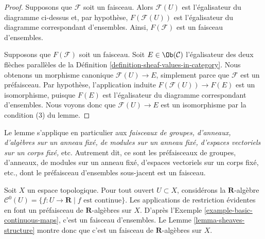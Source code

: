\begin{proof}
Supposons que $\mathcal{F}$ soit un faisceau. Alors
$\mathcal{F}(U)$ est l'égalisateur du diagramme
ci-dessus et, par hypothèse, $F(\mathcal{F}(U))$
est l'égalisateur du diagramme correspondant
d'ensembles. Ainsi, $F(\mathcal{F})$ est un faisceau d'ensembles.

\medskip\noindent
Supposons que $F(\mathcal{F})$ soit un faisceau.
Soit $E \in \Ob(\mathcal{C})$
l'égalisateur des deux flèches parallèles de la
Définition \ref{definition-sheaf-values-in-category}.
Nous obtenons un morphisme canonique $\mathcal{F}(U) \to E$,
simplement parce que $\mathcal{F}$ est un préfaisceau.
Par hypothèse, l'application induite $F(\mathcal{F}(U)) \to F(E)$
est un isomorphisme, puisque $F(E)$ est l'égalisateur
du diagramme correspondant d'ensembles. Nous voyons donc que
$\mathcal{F}(U) \to E$ est un isomorphisme
par la condition (3) du lemme.
\end{proof}

\noindent
Le lemme s'applique en particulier aux
{\it faisceaux de groupes, d'anneaux, d'algèbres sur un anneau fixé, de modules
sur un anneau fixé, d'espaces vectoriels sur un corps fixé, } etc.
Autrement dit, ce sont les préfaisceaux de groupes, d'anneaux,
de modules sur un anneau fixé, d'espaces vectoriels sur un corps fixé, etc.,
dont le préfaisceau d'ensembles sous-jacent est un faisceau.

\begin{example}
\label{example-C0-sheaf-rings}
Soit $X$ un espace topologique. Pour tout ouvert $U \subset X$, considérons
la $\mathbf{R}$-algèbre
$\mathcal{C}^{0}(U) = \{ f : U \to \mathbf{R} \mid f\text{ est continue}\}$.
Les applications de restriction évidentes en font un
préfaisceau de $\mathbf{R}$-algèbres sur $X$.
D'après l'Exemple \ref{example-basic-continuous-maps}, c'est un faisceau d'ensembles.
Le Lemme \ref{lemma-sheaves-structure} montre donc que c'est un faisceau de
$\mathbf{R}$-algèbres sur $X$.
\end{example}

